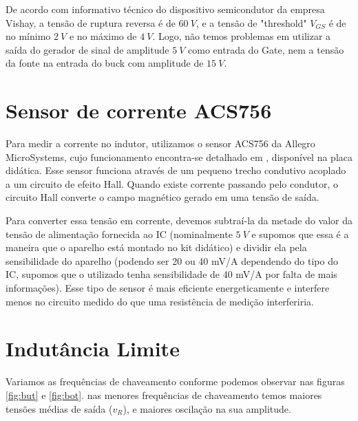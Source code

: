 \documentclass{article}
\begin{document}
De acordo com informativo técnico do dispositivo semicondutor da empresa Vishay, a tensão de ruptura reversa é de $60\ V$, e a tensão de "threshold" $V_{GS}$ é de no mínimo $2\ V$ e no máximo de $4\ V$. Logo, não temos problemas em utilizar a saída do gerador de sinal de amplitude $5\ V$ como entrada do Gate, nem a tensão da fonte na entrada do buck com amplitude de $15\ V$.

\section{Sensor de corrente ACS756}
Para medir a corrente no indutor, utilizamos o sensor ACS756 da Allegro MicroSystems, cujo funcionamento encontra-se detalhado em \cite{bb:allegro}, disponível na placa didática. Esse sensor funciona através de um pequeno trecho condutivo acoplado a um circuito de efeito Hall. Quando existe corrente passando pelo condutor, o circuito Hall converte o campo magnético gerado em uma tensão de saída. 

Para converter essa tensão em corrente, devemos subtraí-la da metade do valor da tensão de alimentação fornecida ao IC (nominalmente $5\ V$ e supomos que essa é a maneira que o aparelho está montado no kit didático) e dividir ela pela sensibilidade do aparelho (podendo ser 20 ou 40 mV/A dependendo do tipo do IC, supomos que o utilizado tenha sensibilidade de 40 mV/A por falta de mais informações). Esse tipo de sensor é mais eficiente energeticamente e interfere menos no circuito medido do que uma resistência de medição interferiria.


\section{Indutância Limite}

Variamos as frequências de chaveamento conforme podemos observar nas figuras \ref{fig:but} e \ref{fig:bot}. nas menores frequências de chaveamento temos maiores tensões médias de saída ($v_R$), e maiores oscilação na sua amplitude.
\end{document}
